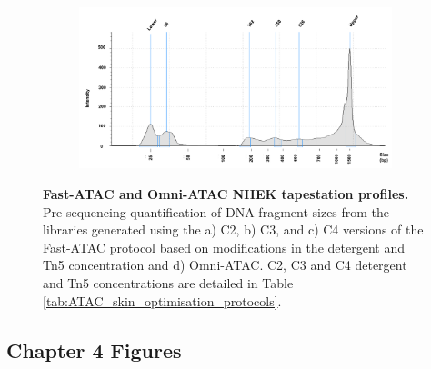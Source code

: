 \begin{figure}[htbp]
\begin{subfigure}{0.70\textwidth}
\caption{\textbf{}} %
\end{subfigure}
\begin{subfigure}{0.70\textwidth}
\centering
\includegraphics[width=\textwidth]{./Appendix/pdfs/Chapter3/Omni_ATAC_NHEK_Rep1_tapestation}
\caption{\textbf{}} %
\end{subfigure}
\hfill
\caption[Fast-ATAC and Omni-ATAC NHEK tapestation profiles.]{\textbf{Fast-ATAC and Omni-ATAC NHEK tapestation profiles.} Pre-sequencing quantification of DNA fragment sizes from the libraries generated  using the a) C2, b) C3, and c) C4 versions of the Fast-ATAC protocol based on modifications in the detergent and Tn5 concentration and d) Omni-ATAC. C2, C3 and C4 detergent and Tn5 concentrations are detailed in Table \ref{tab:ATAC_skin_optimisation_protocols}.}
\label{figure:NHEK_tapestation}
\end{figure}

\subsection{Chapter 4 Figures}

